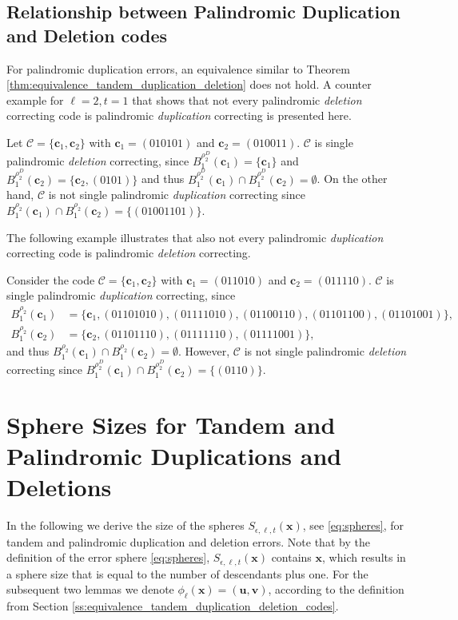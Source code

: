 \documentclass[a4paper]{llncs}
\newcommand{\ve}[1]{\boldsymbol{#1}}
\begin{document}
	\subsection{Relationship between Palindromic Duplication and Deletion codes}
	For palindromic duplication errors, an equivalence similar to Theorem \ref{thm:equivalence_tandem_duplication_deletion} does not hold. A counter example for $\ell=2, t=1$ that shows that not every palindromic \emph{deletion} correcting code is palindromic \emph{duplication} correcting is presented here.
	\begin{example}
		Let $\mathcal{C} = \{\ve{c}_1, \ve{c}_2\}$ with $\ve{c}_1 = (010101)$ and $\ve{c}_2 = (010011)$. $\mathcal{C}$ is single palindromic \emph{deletion} correcting, since $B^{\rho_2^D}_1(\ve{c}_1) = \{\ve{c}_1\}$ and $B^{\rho_2^D}_1(\ve{c}_2) = \{\ve{c}_2, (0101)\}$ and thus $B^{\rho_2^D}_1(\ve{c}_1) \cap B^{\rho_2^D}_1(\ve{c}_2)= \emptyset$. On the other hand, $\mathcal{C}$ is not single palindromic \emph{duplication} correcting since $B^{\rho_2}_1(\ve{c}_1) \cap B^{\rho_2}_1(\ve{c}_2) = \{(01001101)\}$.
	\end{example}
	The following example illustrates that also not every palindromic \emph{duplication} correcting code is palindromic \emph{deletion} correcting.
	\begin{example}
		Consider the code $\mathcal{C} = \{\ve{c}_1, \ve{c}_2\}$ with $\ve{c}_1 = (011010)$ and $\ve{c}_2 = (011110)$. $\mathcal{C}$ is single palindromic \emph{duplication} correcting, since 
		\begin{align*}
		B^{\rho_2}_1(\ve{c}_1) &= \{\ve{c}_1, (01101010), (01111010), (01100110), (01101100), (01101001)\}, \\ B^{\rho_2}_1(\ve{c}_2) &= \{\ve{c}_2, (01101110), (01111110), (01111001)\},
		\end{align*}
		and thus $B^{\rho_2}_1(\ve{c}_1) \cap B^{\rho_2}_1(\ve{c}_2)= \emptyset$. However, $\mathcal{C}$ is not single palindromic \emph{deletion} correcting since $B^{\rho_2^D}_1(\ve{c}_1) \cap B^{\rho_2^D}_1(\ve{c}_2) = \{(0110)\}$.
	\end{example}
	\section{Sphere Sizes for Tandem and Palindromic Duplications and Deletions} \label{sec:error_spheres_tandem_palindromic_dupliations_deletions}
	In the following we derive the size of the spheres $S_{\epsilon, \ell, t}(\ve{x})$, see \eqref{eq:spheres}, for tandem and palindromic duplication and deletion errors. Note that by the definition of the error sphere \eqref{eq:spheres}, $S_{\epsilon, \ell, t}(\ve{x})$ contains $\ve{x}$, which results in a sphere size that is equal to the number of descendants plus one. For the subsequent two lemmas we denote $\phi_\ell(\ve{x})=(\ve{u}, \ve{v})$, according to the definition from Section \ref{ss:equivalence_tandem_duplication_deletion_codes}.
\end{document}
